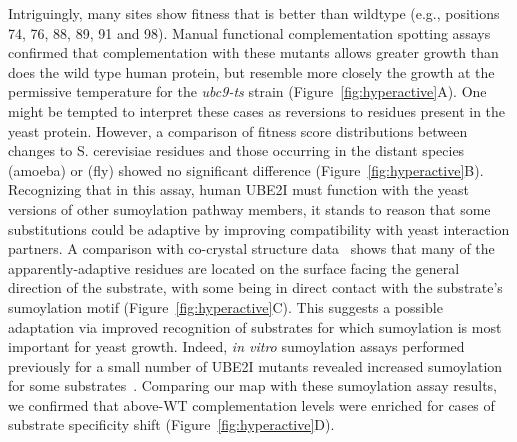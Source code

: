 Intriguingly, many sites show fitness that is better than wildtype (e.g., positions 74, 76, 88, 89, 91 and 98). Manual functional complementation spotting assays confirmed that complementation with these mutants allows greater growth than does the wild type human protein, but resemble more closely the growth at the permissive temperature for the \textit{ubc9-ts} strain (Figure~\ref{fig:hyperactive}A). One might be tempted to interpret these cases as reversions to residues present in the yeast protein. However, a comparison of fitness score distributions between changes to S. cerevisiae  residues and those occurring in the distant species  (amoeba) or  (fly) showed no significant difference (Figure~\ref{fig:hyperactive}B). Recognizing that in this assay, human UBE2I must function with the yeast versions of other sumoylation pathway members, it stands to reason that some substitutions could be adaptive by improving compatibility with yeast interaction partners. A comparison with co-crystal structure data~\cite{gareau_determinants_2012} shows that many of the apparently-adaptive residues are located on the surface facing the general direction of the substrate, with some being in direct contact with the substrate's sumoylation motif (Figure~\ref{fig:hyperactive}C). This suggests a possible adaptation via improved recognition of substrates for which sumoylation is most important for yeast growth. Indeed, \textit{in vitro} sumoylation assays performed previously for a small number of UBE2I mutants revealed increased sumoylation for some substrates~\cite{bernier-villamor_structural_2002}. Comparing our map with these sumoylation assay results, we confirmed that above-WT complementation levels were enriched for cases of substrate specificity shift (Figure~\ref{fig:hyperactive}D). 


